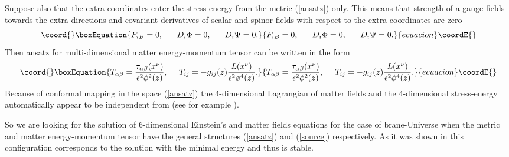 \documentclass[a4paper,a4paper]{article}
\begin{document}
Suppose also that the extra coordinates enter the stress-energy
\coordHE{} from the metric (\ref{ansatz}) only. This means that
strength of a gauge fields \coordHE{} towards the extra directions
and covariant derivatives of scalar \myHighlight{$\Phi$}\coordHE{} and spinor \myHighlight{$\Psi$}\coordHE{} 
fields with respect to the extra coordinates are zero \cite{G3}
\begin{equation}\coord{}\boxEquation{ \label{extra}
F_{iB} = 0 , ~~~~~D_i\Phi = 0 , ~~~~~D_i\Psi = 0.
}{ F_{iB} = 0 , ~~~~~D_i\Phi = 0 , ~~~~~D_i\Psi = 0.
}{ecuacion}\coordE{}\end{equation}
Then ansatz for multi-dimensional matter energy-momentum tensor can
be written in the form
\begin{equation}\coord{}\boxEquation{ \label{source}
T_{\alpha\beta } = \frac{\tau_{\alpha\beta }(x^\nu)}{\epsilon^2
\phi ^2(z)}, ~~~~ T_{ij} = - g_{ij}(z)\frac{L(x^\nu)}{\epsilon^2
\phi ^4(z)} .
}{ T_{\alpha\beta } = \frac{\tau_{\alpha\beta }(x^\nu)}{\epsilon^2
\phi ^2(z)}, ~~~~ T_{ij} = - g_{ij}(z)\frac{L(x^\nu)}{\epsilon^2
\phi ^4(z)} .
}{ecuacion}\coordE{}\end{equation}
Because of conformal mapping in the space (\ref{ansatz}) the
4-dimensional Lagrangian of matter fields \coordHE{} and the
4-dimensional stress-energy \coordHE{}
automatically appear to be independent from \coordHE{} (see for example
\cite{PeRi}).

So we are looking for the solution of 6-dimensional Einstein's and
matter fields equations for the case of brane-Universe when the
metric and matter energy-momentum tensor have the general structures
(\ref{ansatz}) and (\ref{source}) respectively. As it was shown in
\cite{G3} this configuration corresponds to the solution with the
minimal energy and thus is stable.
\end{document}

